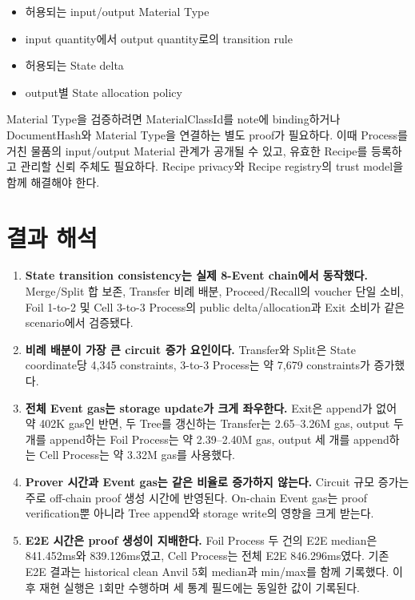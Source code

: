 \documentclass[11pt,a4paper]{extarticle}
\begin{document}
\begin{itemize}
  \item 허용되는 input/output Material Type
  \item input quantity에서 output quantity로의 transition rule
  \item 허용되는 State delta
  \item output별 State allocation policy
\end{itemize}

Material Type을 검증하려면 MaterialClassId를 note에 binding하거나 DocumentHash와
Material Type을 연결하는 별도 proof가 필요하다. 이때 Process를 거친 물품의
input/output Material 관계가 공개될 수 있고, 유효한 Recipe를 등록하고 관리할
신뢰 주체도 필요하다. Recipe privacy와 Recipe registry의 trust model을 함께 해결해야
한다.

\section{결과 해석}

\begin{enumerate}
  \item \textbf{State transition consistency는 실제 8-Event chain에서 동작했다.}
        Merge/Split 합 보존, Transfer 비례 배분, Proceed/Recall의 voucher 단일 소비,
        Foil 1-to-2 및 Cell 3-to-3 Process의 public delta/allocation과 Exit 소비가 같은
        scenario에서 검증됐다.
  \item \textbf{비례 배분이 가장 큰 circuit 증가 요인이다.}
        Transfer와 Split은 State coordinate당 4,345 constraints, 3-to-3 Process는 약
        7,679 constraints가 증가했다.
  \item \textbf{전체 Event gas는 storage update가 크게 좌우한다.}
        Exit은 append가 없어 약 402K gas인 반면, 두 Tree를 갱신하는 Transfer는
        2.65--3.26M gas, output 두 개를 append하는 Foil Process는 약 2.39--2.40M gas,
        output 세 개를 append하는 Cell Process는 약 3.32M gas를 사용했다.
  \item \textbf{Prover 시간과 Event gas는 같은 비율로 증가하지 않는다.}
        Circuit 규모 증가는 주로 off-chain proof 생성 시간에 반영된다. On-chain Event
        gas는 proof verification뿐 아니라 Tree append와 storage write의 영향을 크게 받는다.
  \item \textbf{E2E 시간은 proof 생성이 지배한다.}
        Foil Process 두 건의 E2E median은 841.452ms와 839.126ms였고, Cell Process는
        전체 E2E 846.296ms였다.
        기존 E2E 결과는 historical clean Anvil 5회 median과 min/max를 함께 기록했다.
        이후 재현 실행은 1회만 수행하며 세 통계 필드에는 동일한 값이 기록된다.
\end{enumerate}
\end{document}
